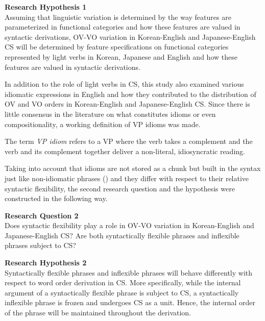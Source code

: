\begin{exe}
\ex\label{ex:19} \textbf{Research Hypothesis 1} \\
Assuming that linguistic variation is determined by the way features are parameterized in functional categories and how these features are valued in syntactic derivations, \ac{OV}-\ac{VO} variation in Korean-English and Japanese-English \ac{CS} will be determined by feature specifications on functional categories represented by light verbs in Korean, Japanese and English and how these features are valued in syntactic derivations.
\end{exe}


In addition to the role of light verbs in \ac{CS}, this study also examined various idiomatic expressions in English and how they contributed to the distribution of \ac{OV} and  \ac{VO} orders in Korean-English and Japanese-English \ac{CS}. Since there is little consensus in the literature on what constitutes idioms or even compositionality, a working definition of \ac{VP} idioms was made. 

\begin{exe}
\ex\label{ex:20} The term \textit{\ac{VP} idiom} refers to a \ac{VP} where the verb takes a complement and the verb and its complement together deliver a non-literal, idiosyncratic reading.
\end{exe}

Taking into account that idioms are not stored as a chunk but built in the syntax just like non-idiomatic phrases (\citealt{EpsteinSeely2006,Nediger2017}) and they differ with respect to their relative syntactic flexibility, the second research question and the hypothesis were constructed in the following way. 

\begin{exe}
\ex\label{ex:21} \textbf{Research Question 2} \\
Does syntactic flexibility play a role in \ac{OV}-\ac{VO} variation in Korean-English and Japanese-English \ac{CS}? Are both syntactically flexible {phrases}  and inflexible phrases subject to \ac{CS}?

\ex\label{ex:22}  \textbf{Research Hypothesis 2} \\
Syntactically flexible phrases and inflexible phrases will behave differently with respect to word order derivation in \ac{CS}. More specifically, while the internal argument of a syntactically flexible phrase is subject to \ac{CS}, a syntactically inflexible phrase is frozen and undergoes \ac{CS} as a unit. Hence, the internal order of the phrase will be maintained throughout the derivation.
\end{exe}

